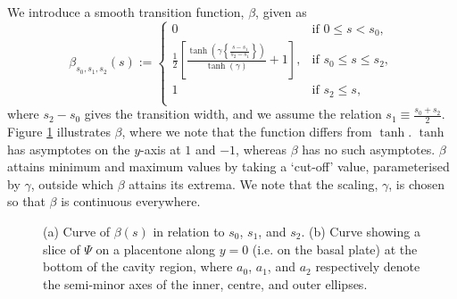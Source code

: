     We introduce a smooth transition function, $\beta$, given as
    \begin{equation}
        \beta_{s_0,s_1,s_2}(s) := 
        \begin{cases}
            0 & \text{if } 0 \leq s < s_0, \\
            \frac{1}{2}\left[ \frac{\tanh(\gamma\left\{ \frac{s-s_1}{s_2-s_1} \right\})}{\tanh(\gamma)} + 1 \right], & \text{if } s_0 \leq s \leq s_2, \\
            1 & \text{if } s_2 \leq s, \\
        \end{cases}
    \end{equation}
    where $s_2 - s_0$ gives the transition width, and we assume the relation $s_1 \equiv \frac{s_0 + s_2}{2}$. Figure \ref{fig:transition:beta} illustrates $\beta$, where we note that the function differs from $\tanh$. $\tanh$ has asymptotes on the $y$-axis at $1$ and $-1$, whereas $\beta$ has no such asymptotes. $\beta$ attains minimum and maximum values by taking a `cut-off' value, parameterised by $\gamma$, outside which $\beta$ attains its extrema. We note that the scaling, $\gamma$, is chosen so that $\beta$ is continuous everywhere.

    \begin{figure}
        \begin{subfigure}[b]{0.45\textwidth}
            \centering
            
            \caption{}
            \label{fig:transition:beta}
        \end{subfigure}
        \hfill
        \begin{subfigure}[b]{0.45\textwidth}
            \centering
            
            \caption{}
            \label{fig:transition:slice}
        \end{subfigure}
        \caption{(a) Curve of $\beta(s)$ in relation to $s_0$, $s_1$, and $s_2$. (b) Curve showing a slice of $\Psi$ on a placentone along $y = 0$ (i.e. on the basal plate) at the bottom of the cavity region, where $a_0$, $a_1$, and $a_2$ respectively denote the semi-minor axes of the inner, centre, and outer ellipses.}
        \label{fig:transition}
    \end{figure}

